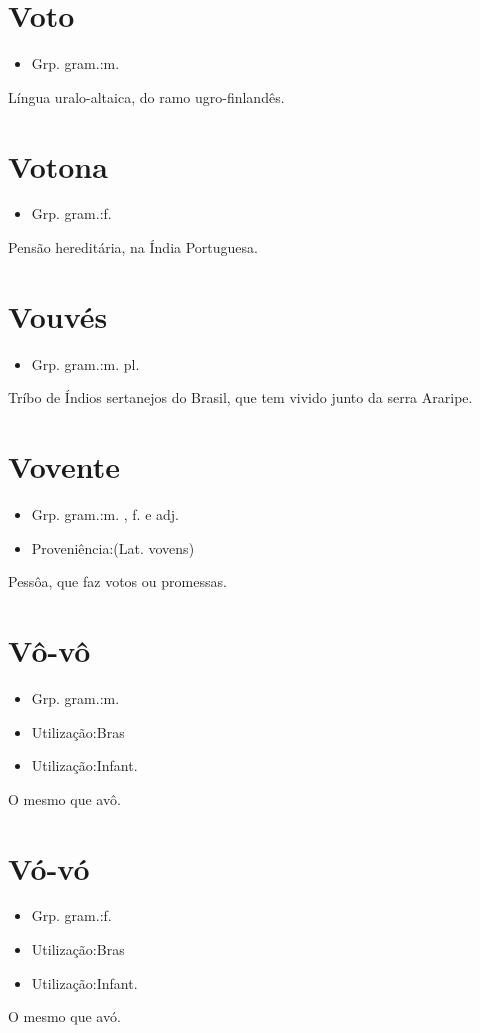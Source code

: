 \documentclass{article}
\begin{document}
\section{Voto}
\begin{itemize}
\item {Grp. gram.:m.}
\end{itemize}
Língua uralo-altaica, do ramo ugro-finlandês.
\section{Votona}
\begin{itemize}
\item {Grp. gram.:f.}
\end{itemize}
Pensão hereditária, na Índia Portuguesa.
\section{Vouvés}
\begin{itemize}
\item {Grp. gram.:m. pl.}
\end{itemize}
Tríbo de Índios sertanejos do Brasil, que tem vivido junto da serra Araripe.
\section{Vovente}
\begin{itemize}
\item {Grp. gram.:m. ,  f.  e  adj.}
\end{itemize}
\begin{itemize}
\item {Proveniência:(Lat. \textunderscore vovens\textunderscore )}
\end{itemize}
Pessôa, que faz votos ou promessas.
\section{Vô-vô}
\begin{itemize}
\item {Grp. gram.:m.}
\end{itemize}
\begin{itemize}
\item {Utilização:Bras}
\end{itemize}
\begin{itemize}
\item {Utilização:Infant.}
\end{itemize}
O mesmo que \textunderscore avô\textunderscore .
\section{Vó-vó}
\begin{itemize}
\item {Grp. gram.:f.}
\end{itemize}
\begin{itemize}
\item {Utilização:Bras}
\end{itemize}
\begin{itemize}
\item {Utilização:Infant.}
\end{itemize}
O mesmo que \textunderscore avó\textunderscore .
\end{document}
